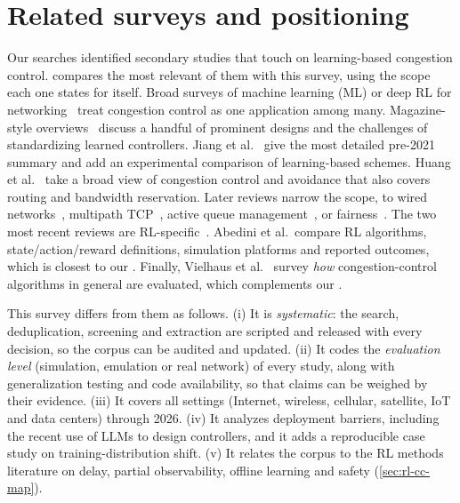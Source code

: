 \section{Related surveys and positioning}
\label{sec:related}

Our searches identified \nSecondary{} secondary studies that touch on learning-based congestion control.  compares the most relevant of them with this survey, using the scope each one states for itself. Broad surveys of machine learning (ML) or deep RL for networking~\cite{boutaba2018comprehensive,wang2018machine,luong2019applications,tang2021survey} treat congestion control as one application among many. Magazine-style overviews~\cite{zhang2019machine,zhang2020machine,wei2021congestion} discuss a handful of prominent designs and the challenges of standardizing learned controllers. Jiang et al.~\cite{jiang2021when} give the most detailed pre-2021 summary and add an experimental comparison of learning-based schemes. Huang et al.~\cite{huang2021machine} take a broad view of congestion control and avoidance that also covers routing and bandwidth reservation. Later reviews narrow the scope, to wired networks~\cite{lakshmi2022methods}, multipath TCP~\cite{maliha2023survey}, active queue management~\cite{toopchinezhad2025machine}, or fairness~\cite{haque2025fairness}. The two most recent reviews are RL-specific~\cite{li2025survey,abedini2027dynamic}. Abedini et al.\ compare RL algorithms, state/action/reward definitions, simulation platforms and reported outcomes, which is closest to our . Finally, Vielhaus et al.~\cite{vielhaus2026evaluating} survey \emph{how} congestion-control algorithms in general are evaluated, which complements our .

This survey differs from them as follows. (i) It is \emph{systematic}: the search, deduplication, screening and extraction are scripted and released with every decision, so the corpus can be audited and updated. (ii) It codes the \emph{evaluation level} (simulation, emulation or real network) of every study, along with generalization testing and code availability, so that claims can be weighed by their evidence. (iii) It covers all settings (Internet, wireless, cellular, satellite, IoT and data centers) through 2026. (iv) It analyzes deployment barriers, including the recent use of LLMs to design controllers, and it adds a reproducible case study on training-distribution shift. (v) It relates the corpus to the RL methods literature on delay, partial observability, offline learning and safety (\cref{sec:rl-cc-map}).

